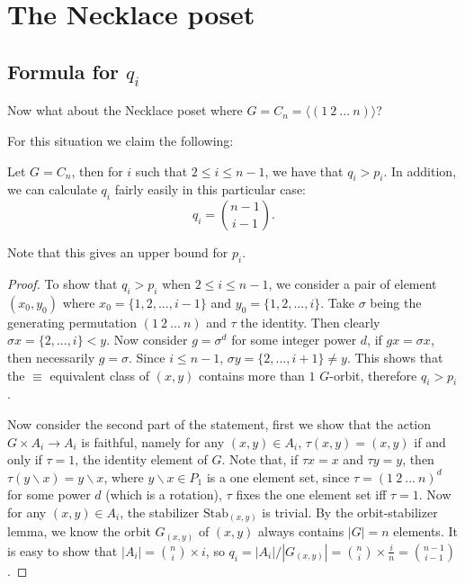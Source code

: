 \documentclass[12pt]{article}
\newcommand{\1}{\mathbb{I}}
\newcommand{\ra}{\rightarrow}
\newcommand{\minus}{\backslash}
\newcommand{\gr}[1]{\langle {#1} \rangle}
\theoremstyle{definition}
\theoremstyle{definition}
\theoremstyle{definition}
\theoremstyle{definition}
\theoremstyle{definition}
\theoremstyle{definition}
\begin{document}
\newpage

\section{The Necklace poset}

\subsection{Formula for $q_i$}

Now what about the Necklace poset where $G = C_n = \gr{(1 \:2\: ... \: n)}$? 

For this situation we claim the following: 

\proposition{} Let $G = C_n$, then for $i$ such that $2 \le i \le n - 1$, we have that $q_i > p_i$. In addition, we can calculate $q_i$ fairly easily in this particular case: $$q_i = {n-1 \choose i -1}.$$

Note that this gives an upper bound for $p_i$. 

\begin{proof}

To show that $q_i > p_i$ when $2 \le i \le n-1$, we consider a pair of element $(x_0, y_0)$ where $x_0 = \{1, 2, ..., i-1\}$ and $y_0 = \{1, 2, ..., i\}$. Take $\sigma $ being the generating permutation $(1 \:2\: ... \: n)$ and $\tau$ the identity. Then clearly $\sigma x = \{2, ..., i \} < y$. Now consider $g = \sigma ^d$ for some integer power $d$, if $g x = \sigma x$, then necessarily $g  = \sigma$. Since $i \le n -1$, $\sigma y = \{2, ..., i+1 \} \ne y$. This shows that the $\equiv$ equivalent class of $(x, y)$ contains more than $1$ $G$-orbit, therefore $q_i > p_i$.

Now consider the second part of the statement, first we show that the action $G \times A_i \ra A_i$ is faithful, namely for any $(x, y) \in A_i$,  $\tau (x, y) = (x, y) $ if and only if $\tau = 1$, the identity element of $G$. Note that, if $\tau x = x$ and $\tau y = y$, then $\tau (y \minus x) = y \minus x$, where $y \minus x \in P_1$ is a one element set, since $\tau = (1 \: 2 \: ... \: n)^d$  for some power $d$ (which is a rotation), $\tau$ fixes the one element set iff $\tau = 1$. Now for any $(x, y) \in A_i$, the stabilizer $\text{Stab}_{(x, y)}$ is trivial. By the orbit-stabilizer lemma, we know the orbit $G_{(x,y)}$ of $(x, y)$ always contains $|G| = n$ elements.  It is easy to show that $|A_i| = {n \choose i } \times i$, so $q_i = |A_i|/|G_{(x, y)}| = {n \choose i } \times  \frac{i}{n} = {n -1 \choose i -1}$. 

\end{proof}
\end{document}
